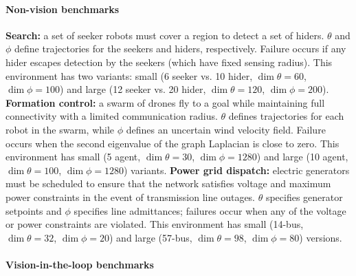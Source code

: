 {\paragraph{Non-vision benchmarks}  %
%
\textbf{Search:} a set of seeker robots must cover a region to detect a set of hiders. $\theta$ and $\phi$ define trajectories for the seekers and hiders, respectively. Failure occurs if any hider escapes detection by the seekers (which have fixed sensing radius). This environment has two variants: small (6 seeker vs. 10 hider, $\dim{\theta} = 60$, $\dim{\phi} = 100$) and large (12 seeker vs. 20 hider, $\dim{\theta} = 120$, $\dim{\phi} = 200$).
%
\textbf{Formation control:} a swarm of drones fly to a goal while maintaining full connectivity with a limited communication radius. $\theta$ defines trajectories for each robot in the swarm, while $\phi$ defines an uncertain wind velocity field. Failure occurs when the second eigenvalue of the graph Laplacian is close to zero. This environment has small (5 agent, $\dim{\theta} = 30$, $\dim{\phi} = 1280$) and large (10 agent, $\dim{\theta} = 100$, $\dim{\phi} = 1280$) variants.
%
\textbf{Power grid dispatch:} electric generators must be scheduled to ensure that the network satisfies voltage and maximum power constraints in the event of transmission line outages. $\theta$ specifies generator setpoints and $\phi$ specifies line admittances; failures occur when any of the voltage or power constraints are violated. This environment has small (14-bus, $\dim{\theta} = 32$, $\dim{\phi} = 20$) and large (57-bus, $\dim{\theta} = 98$, $\dim{\phi} = 80$) versions.

\paragraph{Vision-in-the-loop benchmarks}

}
